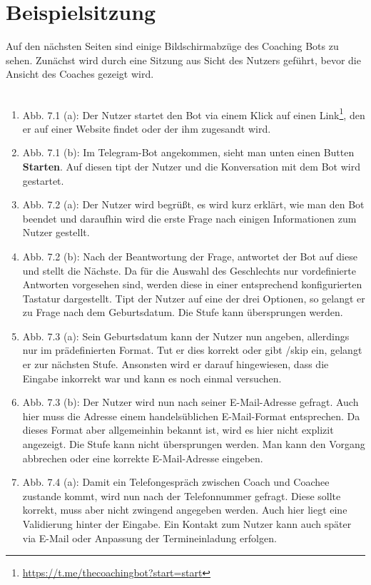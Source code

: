 \label{Beispiele}
\chapter{Beispielsitzung}

	Auf den nächsten Seiten sind einige Bildschirmabzüge des Coaching Bots zu sehen. Zunächst wird durch eine Sitzung aus Sicht des Nutzers geführt, bevor die Ansicht des Coaches gezeigt wird.\\ 
	\\
	\begin{enumerate}
		\item Abb. 7.1 (a): Der Nutzer startet den Bot via einem Klick auf einen Link\footnote{\url{https://t.me/thecoachingbot?start=start}}, den er auf einer Website findet oder der ihm zugesandt wird.
		\item Abb. 7.1 (b): Im Telegram-Bot angekommen, sieht man unten einen Butten \textbf{Starten}. Auf diesen tipt der Nutzer und die Konversation mit dem Bot wird gestartet.
		\item Abb. 7.2 (a): Der Nutzer wird begrüßt, es wird kurz erklärt, wie man den Bot beendet und daraufhin wird die erste Frage nach einigen Informationen zum Nutzer gestellt.
		\item Abb. 7.2 (b): Nach der Beantwortung der Frage, antwortet der Bot auf diese und stellt die Nächste. Da für die Auswahl des Geschlechts nur vordefinierte Antworten vorgesehen sind, werden diese in einer entsprechend konfigurierten Tastatur dargestellt. Tipt der Nutzer auf eine der drei Optionen, so gelangt er zu Frage nach dem Geburtsdatum. Die Stufe kann übersprungen werden.
		\item Abb. 7.3 (a): Sein Geburtsdatum kann der Nutzer nun angeben, allerdings nur im prädefinierten Format. Tut er dies korrekt oder gibt /skip ein, gelangt er zur nächsten Stufe. Ansonsten wird er darauf hingewiesen, dass die Eingabe inkorrekt war und kann es noch einmal versuchen. 
		\item Abb. 7.3 (b): Der Nutzer wird nun nach seiner E-Mail-Adresse gefragt. Auch hier muss die Adresse einem handelsüblichen E-Mail-Format entsprechen. Da dieses Format aber allgemeinhin bekannt ist, wird es hier nicht explizit angezeigt. Die Stufe kann nicht übersprungen werden. Man kann den Vorgang abbrechen oder eine korrekte E-Mail-Adresse eingeben.
		\item Abb. 7.4 (a): Damit ein Telefongespräch zwischen Coach und Coachee zustande kommt, wird nun nach der Telefonnummer gefragt. Diese sollte korrekt, muss aber nicht zwingend angegeben werden. Auch hier liegt eine Validierung hinter der Eingabe. Ein Kontakt zum Nutzer kann auch später via E-Mail oder Anpassung der Termineinladung erfolgen. 

\end{enumerate}
